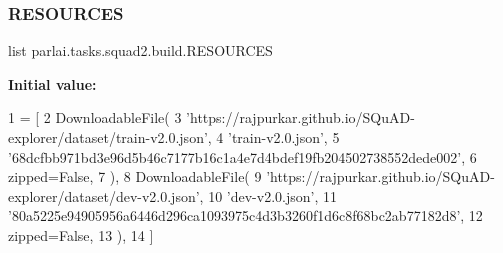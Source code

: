 \subsubsection{\texorpdfstring{R\+E\+S\+O\+U\+R\+C\+ES}{RESOURCES}}
{\footnotesize\ttfamily list parlai.\+tasks.\+squad2.\+build.\+R\+E\+S\+O\+U\+R\+C\+ES}

{\bfseries Initial value\+:}
\begin{DoxyCode}
1 =  [
2     DownloadableFile(
3         \textcolor{stringliteral}{'https://rajpurkar.github.io/SQuAD-explorer/dataset/train-v2.0.json'},
4         \textcolor{stringliteral}{'train-v2.0.json'},
5         \textcolor{stringliteral}{'68dcfbb971bd3e96d5b46c7177b16c1a4e7d4bdef19fb204502738552dede002'},
6         zipped=\textcolor{keyword}{False},
7     ),
8     DownloadableFile(
9         \textcolor{stringliteral}{'https://rajpurkar.github.io/SQuAD-explorer/dataset/dev-v2.0.json'},
10         \textcolor{stringliteral}{'dev-v2.0.json'},
11         \textcolor{stringliteral}{'80a5225e94905956a6446d296ca1093975c4d3b3260f1d6c8f68bc2ab77182d8'},
12         zipped=\textcolor{keyword}{False},
13     ),
14 ]
\end{DoxyCode}
